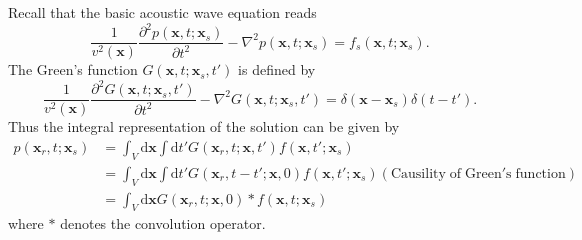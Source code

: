 Recall that the basic acoustic wave equation reads
\begin{displaymath}
\frac{1}{v^2(\textbf{x})}\frac{\partial^2 p(\textbf{x},t;\textbf{x}_s)}{\partial t^2}-\nabla^2 p(\textbf{x},t;\textbf{x}_s)=f_s(\textbf{x},t;\textbf{x}_s).
\end{displaymath}
The Green's function $G(\textbf{x},t;\textbf{x}_s,t')$ is defined by
\begin{equation}
\frac{1}{v^2(\textbf{x})}\frac{\partial^2 G(\textbf{x},t;\textbf{x}_s,t')}{\partial t^2}
-\nabla^2 G(\textbf{x},t; \textbf{x}_s,t')
=\delta(\textbf{x}-\textbf{x}_s)\delta(t-t').
\end{equation}
Thus the integral representation of the solution can be given by \citep{tarantola1984inversion}
\begin{equation}
\begin{split}
p(\textbf{x}_r,t; \textbf{x}_s)&=\int_V \mathrm{d}\textbf{x}\int\mathrm{d}t' G(\textbf{x}_r,t;\textbf{x},t')f(\textbf{x},t';\textbf{x}_s)\\
&=\int_V \mathrm{d}\textbf{x}\int\mathrm{d}t' G(\textbf{x}_r,t-t';\textbf{x},0)f(\textbf{x},t';\textbf{x}_s)(\mathrm{Causility\; of\; Green's\; function})\\
&=\int_V \mathrm{d}\textbf{x} G(\textbf{x}_r,t;\textbf{x},0)*f(\textbf{x},t;\textbf{x}_s)
\end{split}
\end{equation}
where $*$ denotes the convolution operator.

